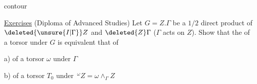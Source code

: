 contour

\uline{Exercises} (Diploma of Advanced Studies) Let $G=Z.\Gamma$ be a $1/2$ direct product of $\deleted{\unsure{I|\Gamma}}Z$ and $\deleted{Z}\Gamma$ ($\Gamma$ acts on $Z$). Show that the  of a torsor  under $G$ is equivalent  that of

a) of a torsor $\omega$ under $\Gamma$

b) of a torsor $T_0$ under $\,{}^\omega Z=\omega\wedge_\Gamma Z$


